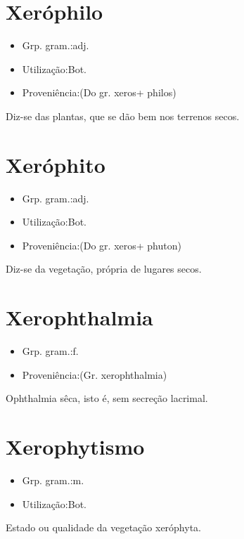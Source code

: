 \section{Xeróphilo}
\begin{itemize}
\item {Grp. gram.:adj.}
\end{itemize}
\begin{itemize}
\item {Utilização:Bot.}
\end{itemize}
\begin{itemize}
\item {Proveniência:(Do gr. \textunderscore xeros\textunderscore  + \textunderscore philos\textunderscore )}
\end{itemize}
Diz-se das plantas, que se dão bem nos terrenos secos.
\section{Xeróphito}
\begin{itemize}
\item {Grp. gram.:adj.}
\end{itemize}
\begin{itemize}
\item {Utilização:Bot.}
\end{itemize}
\begin{itemize}
\item {Proveniência:(Do gr. \textunderscore xeros\textunderscore  + \textunderscore phuton\textunderscore )}
\end{itemize}
Diz-se da vegetação, própria de lugares secos.
\section{Xerophthalmia}
\begin{itemize}
\item {Grp. gram.:f.}
\end{itemize}
\begin{itemize}
\item {Proveniência:(Gr. \textunderscore xerophthalmia\textunderscore )}
\end{itemize}
Ophthalmia sêca, isto é, sem secreção lacrimal.
\section{Xerophytismo}
\begin{itemize}
\item {Grp. gram.:m.}
\end{itemize}
\begin{itemize}
\item {Utilização:Bot.}
\end{itemize}
Estado ou qualidade da vegetação xeróphyta.
